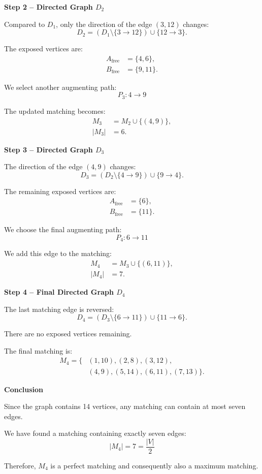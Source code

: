 \documentclass{Group_Templ}
\begin{document}
\medskip
\noindent\textbf{Step 2 -- Directed Graph $D_2$}

Compared to $D_1$, only the direction of
the edge $(3,12)$ changes:
\[
D_2 =
(D_1\setminus\{3\rightarrow 12\})
\cup\{12\rightarrow 3\}.
\]

The exposed vertices are:
\[
\begin{aligned}
	A_{\mathrm{free}} &= \{4,6\},\\
	B_{\mathrm{free}} &= \{9,11\}.
\end{aligned}
\]

We select another augmenting path:
\[
\boxed{
	P_3: 4\rightarrow 9
}
\]

The updated matching becomes:
\[
\begin{aligned}
	M_3 &= M_2\cup\{(4,9)\},\\
	|M_3| &= 6.
\end{aligned}
\]

\medskip
\noindent\textbf{Step 3 -- Directed Graph $D_3$}

The direction of the edge $(4,9)$ changes:
\[
D_3 =
(D_2\setminus\{4\rightarrow 9\})
\cup\{9\rightarrow 4\}.
\]

The remaining exposed vertices are:
\[
\begin{aligned}
	A_{\mathrm{free}} &= \{6\},\\
	B_{\mathrm{free}} &= \{11\}.
\end{aligned}
\]

We choose the final augmenting path:
\[
\boxed{
	P_4: 6\rightarrow 11
}
\]

We add this edge to the matching:
\[
\begin{aligned}
	M_4 &= M_3\cup\{(6,11)\},\\
	|M_4| &= 7.
\end{aligned}
\]

\medskip
\noindent\textbf{Step 4 -- Final Directed Graph $D_4$}

The last matching edge is reversed:
\[
D_4 =
(D_3\setminus\{6\rightarrow 11\})
\cup\{11\rightarrow 6\}.
\]

There are no exposed vertices remaining.

The final matching is:
\[
\boxed{
	\begin{aligned}
		M_4 = \{&
		(1,10),(2,8),(3,12),\\
		&(4,9),(5,14),(6,11),(7,13)
		\}.
	\end{aligned}
}
\]

\medskip
\noindent\textbf{Conclusion}

Since the graph contains 14 vertices, any matching
can contain at most seven edges.

We have found a matching containing exactly
seven edges:
\[
\boxed{
	|M_4| = 7 = \frac{|V|}{2}
}
\]

Therefore, $M_4$ is a perfect matching and
consequently also a maximum matching.
\end{document}
